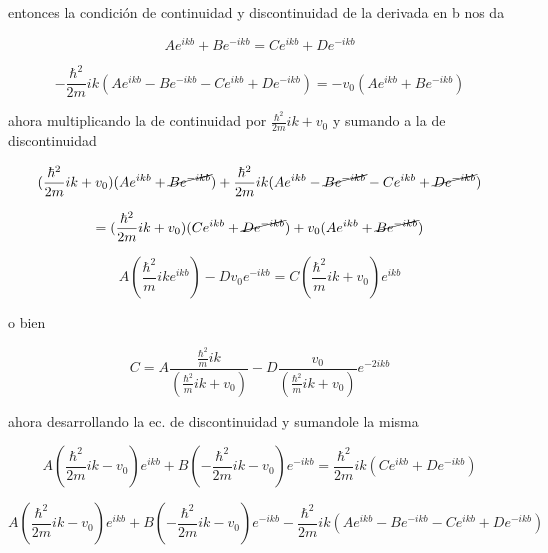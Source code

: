\documentclass[12pt,a4paper]{article}
\begin{document}
\begin{enumerate}
    entonces la condición de continuidad  y discontinuidad de la derivada en b nos da
    
    \begin{equation*}
        A e^{ikb} + B e^{-ikb} = C e^{ikb} + D e^{-ikb}
    \end{equation*}
    
    \begin{equation*}
        - \frac{\hbar^2}{2m} ik (Ae^{ikb}- Be^{-ikb}-C e^{ikb}+D e^{-ikb}) = -v_0 (A e^{ikb} +B e^{-ikb})
    \end{equation*}
    
    ahora multiplicando la de continuidad por $\frac{\hbar^2 }{2m}ik + v_0$ y sumando a la de discontinuidad
    
    \begin{equation*}
        (\frac{\hbar^2 }{2m} ik + v_0)(A e^{ikb} + \cancel{B e^{-ikb}}) + \frac{\hbar^2}{2m} ik (Ae^{ikb}- \cancel{Be^{-ikb}}-C e^{ikb}+\cancel{D e^{-ikb}})
    \end{equation*}
    
    \begin{equation*}
         =(\frac{\hbar^2}{2m}ik + v_0)( C e^{ikb} + \cancel{D e^{-ikb}}) +v_0 (A e^{ikb} +\cancel{B e^{-ikb}})
    \end{equation*}
    
    \begin{equation*}
        A (\frac{\hbar^2}{m}ik e^{ikb}) - D v_0 e^{-ikb} = C (\frac{\hbar^2}{m}ik + v_0) e^{ikb}
    \end{equation*}
    
    o bien
    
    \begin{equation}
        C = A \frac{\frac{\hbar^2}{m}ik}{(\frac{\hbar^2}{m}ik + v_0)} - D \frac{v_0}{(\frac{\hbar^2}{m}ik + v_0)} e^{-2ikb}
    \end{equation}
    
    ahora desarrollando la ec. de discontinuidad y sumandole la misma
    
    \begin{equation*}
         A(\frac{\hbar^2}{2m}ik -v_0)e^{ikb} + B (-\frac{\hbar^2}{2m} ik - v_0) e^{-ikb} = \frac{\hbar^2}{2m}ik (Ce^{ikb} + D e^{-ikb})
    \end{equation*}
    
    \begin{equation*}
         A(\frac{\hbar^2}{2m}ik -v_0)e^{ikb} + B (-\frac{\hbar^2}{2m} ik - v_0) e^{-ikb} - \frac{\hbar^2}{2m} ik (Ae^{ikb}- Be^{-ikb}-C e^{ikb}+D e^{-ikb}) 
    \end{equation*}
    

\end{enumerate}
\end{document}
